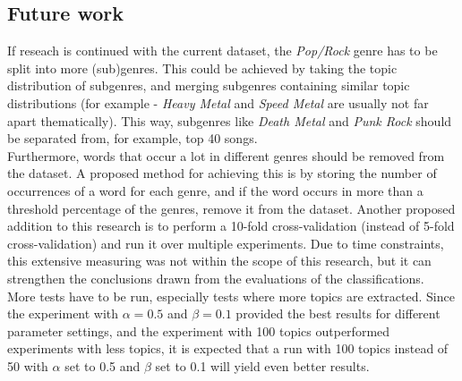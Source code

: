 \subsection{Future work}
If reseach is continued with the current dataset, the \textit{Pop/Rock} genre has to be split into more (sub)genres. This could be achieved by taking the topic distribution of subgenres, and merging subgenres containing similar topic distributions (for example - \textit{Heavy Metal} and \textit{Speed Metal} are usually not far apart thematically). This way, subgenres like \textit{Death Metal} and \textit{Punk Rock} should be separated from, for example, top 40 songs. \\
Furthermore, words that occur a lot in different genres should be removed from the dataset. A proposed method for achieving this is by storing the number of occurrences of a word for each genre, and if the word occurs in more than a threshold percentage of the genres, remove it from the dataset.
Another proposed addition to this research is to perform a 10-fold cross-validation (instead of 5-fold cross-validation) and run it over multiple experiments. Due to time constraints, this extensive measuring was not within the scope of this research, but it can strengthen the conclusions drawn from the evaluations of the classifications. \\
More tests have to be run, especially tests where more topics are extracted. Since the experiment with $\alpha = 0.5$ and $\beta = 0.1$ provided the best results for different parameter settings, and the experiment with 100 topics outperformed experiments with less topics, it is expected that a run with 100 topics instead of 50 with $\alpha$ set to 0.5 and $\beta$ set to 0.1 will yield even better results.